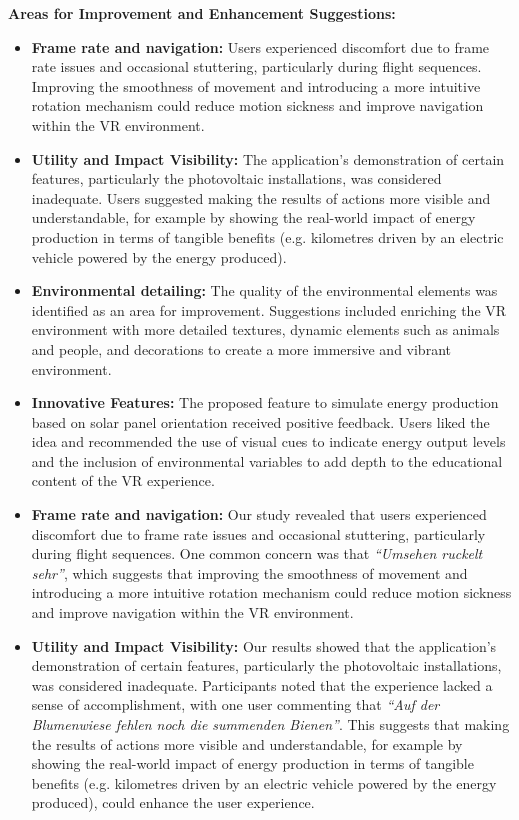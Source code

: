 \documentclass[draft, final]{vutinfth} %
\begin{document}
\textbf{Areas for Improvement and Enhancement Suggestions:}
\begin{itemize}
    \item \textbf{Frame rate and navigation:} Users experienced discomfort due to frame rate issues and occasional stuttering, particularly during flight sequences. Improving the smoothness of movement and introducing a more intuitive rotation mechanism could reduce motion sickness and improve navigation within the VR environment.

    \item \textbf{Utility and Impact Visibility:} The application's demonstration of certain features, particularly the photovoltaic installations, was considered inadequate. Users suggested making the results of actions more visible and understandable, for example by showing the real-world impact of energy production in terms of tangible benefits (e.g. kilometres driven by an electric vehicle powered by the energy produced).

    \item \textbf{Environmental detailing:} The quality of the environmental elements was identified as an area for improvement. Suggestions included enriching the VR environment with more detailed textures, dynamic elements such as animals and people, and decorations to create a more immersive and vibrant environment.

    \item \textbf{Innovative Features:} The proposed feature to simulate energy production based on solar panel orientation received positive feedback. Users liked the idea and recommended the use of visual cues to indicate energy output levels and the inclusion of environmental variables to add depth to the educational content of the VR experience.

    \item \textbf{Frame rate and navigation:} Our study revealed that users experienced discomfort due to frame rate issues and occasional stuttering, particularly during flight sequences. One common concern was that \textit{``Umsehen ruckelt sehr''}, which suggests that improving the smoothness of movement and introducing a more intuitive rotation mechanism could reduce motion sickness and improve navigation within the VR environment.

    \item \textbf{Utility and Impact Visibility:} Our results showed that the application's demonstration of certain features, particularly the photovoltaic installations, was considered inadequate. Participants noted that the experience lacked a sense of accomplishment, with one user commenting that \textit{``Auf der Blumenwiese fehlen noch die summenden Bienen''}. This suggests that making the results of actions more visible and understandable, for example by showing the real-world impact of energy production in terms of tangible benefits (e.g. kilometres driven by an electric vehicle powered by the energy produced), could enhance the user experience.


\end{itemize}
\end{document}
